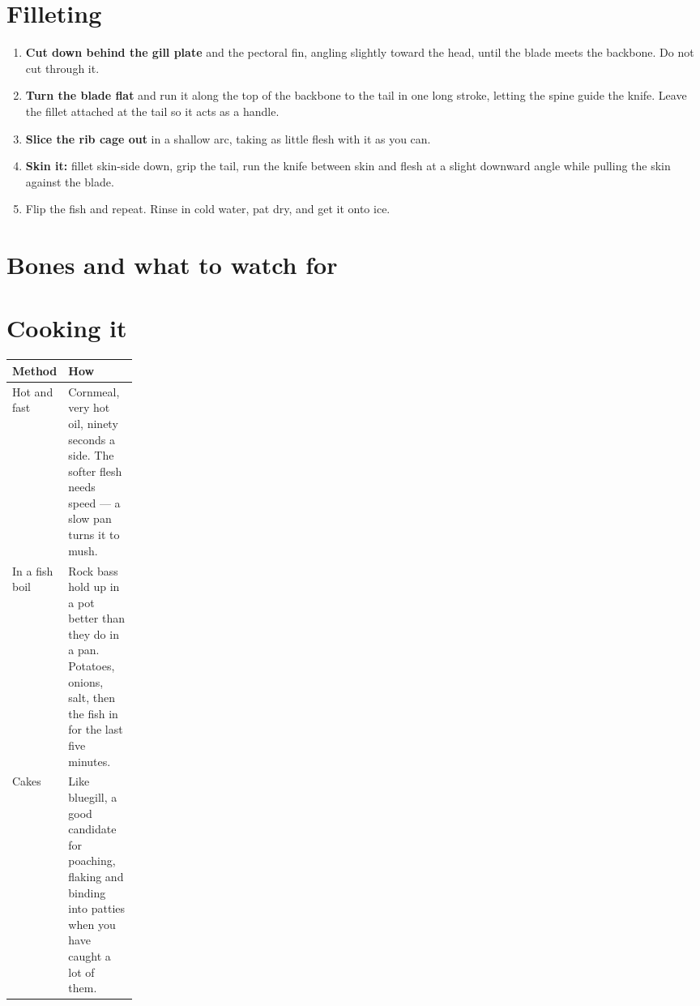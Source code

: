 \section{Filleting}
\begin{enumerate}
\item \textbf{Cut down behind the gill plate} and the pectoral fin, angling slightly toward the head, until the blade meets the backbone. Do not cut through it.
\item \textbf{Turn the blade flat} and run it along the top of the backbone to the tail in one long stroke, letting the spine guide the knife. Leave the fillet attached at the tail so it acts as a handle.
\item \textbf{Slice the rib cage out} in a shallow arc, taking as little flesh with it as you can.
\item \textbf{Skin it:} fillet skin-side down, grip the tail, run the knife between skin and flesh at a slight downward angle while pulling the skin against the blade.
\item Flip the fish and repeat. Rinse in cold water, pat dry, and get it onto ice.
\end{enumerate}

\section{Bones and what to watch for}
\begin{telosfacts}[0.20]
\end{telosfacts}

\section{Cooking it}
\begin{tabularx}{\linewidth}{@{}p{0.18\linewidth}L@{}}
\toprule
\textbf{Method} & \textbf{How}\\
\midrule
Hot and fast & Cornmeal, very hot oil, ninety seconds a side. The softer flesh needs speed --- a slow pan turns it to mush.\\
In a fish boil & Rock bass hold up in a pot better than they do in a pan. Potatoes, onions, salt, then the fish in for the last five minutes.\\
Cakes & Like bluegill, a good candidate for poaching, flaking and binding into patties when you have caught a lot of them.\\
\bottomrule
\end{tabularx}

